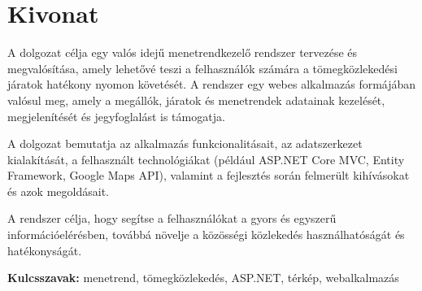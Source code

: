 \section*{Kivonat}

    A dolgozat célja egy valós idejű menetrendkezelő rendszer tervezése és megvalósítása, amely lehetővé teszi a
    felhasználók számára a tömegközlekedési járatok hatékony nyomon követését. A rendszer egy webes alkalmazás formájában valósul meg, amely a megállók, járatok és menetrendek adatainak kezelését, megjelenítését és jegyfoglalást is támogatja.

A dolgozat bemutatja az alkalmazás funkcionalitásait, az adatszerkezet kialakítását, a felhasznált technológiákat (például ASP.NET Core MVC, Entity Framework, Google Maps API), valamint a fejlesztés során felmerült kihívásokat és azok megoldásait.

A rendszer célja, hogy segítse a felhasználókat a gyors és egyszerű információelérésben, továbbá növelje a közösségi közlekedés használhatóságát és hatékonyságát.

\vspace{1cm}

\noindent\textbf{Kulcsszavak:} menetrend, tömegközlekedés, ASP.NET, térkép, webalkalmazás
